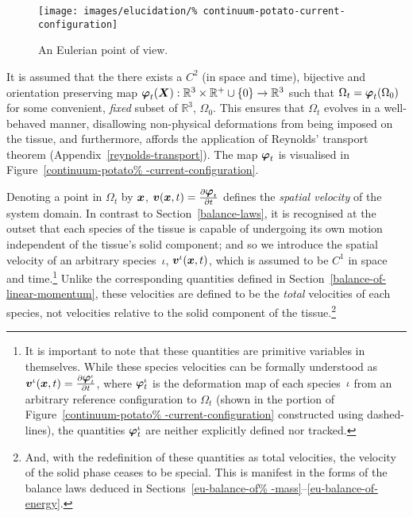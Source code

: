 \begin{figure}
  \centering
  \texttt{[image: images/elucidation/\%
    continuum-potato-current-configuration]}
  \caption{An Eulerian point of view.}
  \label{continuum-potato-current-configuration}
\end{figure}

It is assumed that the there exists a {$\mathit{C}^{2}$} (in space and
time), bijective and orientation preserving map $\mbox{\boldmath$\varphi$}_{t}(\mbox{\boldmath$ X$}):
\mathbb{R}^3\times\mathbb{R}^{+}\cup\{0\} \rightarrow\mathbb{R}^{3}$
such that $\Omega_{t} = \mbox{\boldmath$\varphi$}_{t} (\Omega_{0})$ for some
convenient, {\em fixed} subset of $\mathbb{R}^{3}$, $\Omega_{0}$. This
ensures that $\Omega_{t}$ evolves in a well-behaved manner,
disallowing non-physical deformations from being imposed on the
tissue, and furthermore, affords the application of Reynolds'
transport theorem (Appendix~\ref{reynolds-transport}). The map
$\mbox{\boldmath$\varphi$}_{t}$ is visualised in Figure~\ref{continuum-potato%
-current-configuration}.

Denoting a point in $\Omega_{t}$ by $\mbox{\boldmath$ x$}$, $\mbox{\boldmath$ v$}(\mbox{\boldmath$ x$},t) =
\frac{\partial \mbox{\boldmath$\varphi$}_{t}}{\partial t}$ defines the {\em spatial
  velocity} of the system domain. In contrast to
Section~\ref{balance-laws}, it is recognised at the outset that each
species of the tissue is capable of undergoing its own motion
independent of the tissue's solid component; and so we introduce the
spatial velocity of an arbitrary species~$\iota$,
$\mbox{\boldmath$ v$}^{\iota}(\mbox{\boldmath$ x$},t)$, which is assumed to be $\mathit{C}^{1}$ in space
and time.\footnote{It is important to note that these quantities are
  primitive variables in themselves. While these species velocities
  can be formally understood as \mbox{$\mbox{\boldmath$ v$}^{\iota}(\mbox{\boldmath$ x$},t) =
    \frac{\partial \mbox{\boldmath$\varphi$}^{\iota}_{t}}{\partial t}$}, where
  $\mbox{\boldmath$\varphi$}^{\iota}_{t}$ is the deformation map of each
  species~$\iota$ from an arbitrary reference configuration to
  $\Omega_{t}$ (shown in the portion of Figure~\ref{continuum-potato%
    -current-configuration} constructed using dashed-lines), the
  quantities $\mbox{\boldmath$\varphi$}^{\iota}_{t}$ are neither explicitly defined nor
  tracked.}  Unlike the corresponding quantities defined in
Section~\ref{balance-of-linear-momentum}, these velocities are defined
to be the {\em total} velocities of each species, not velocities
relative to the solid component of the tissue.\footnote{And, with the
  redefinition of these quantities as total velocities, the velocity
  of the solid phase ceases to be special. This is manifest in the
  forms of the balance laws deduced in Sections~\ref{eu-balance-of%
    -mass}--\ref{eu-balance-of-energy}.}

